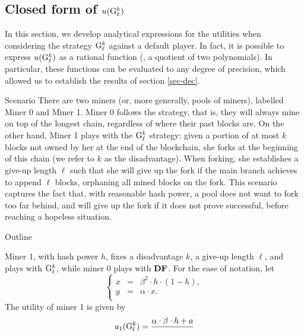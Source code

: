 

\subsection{Closed form of $u({\rm {G}}^k_\ell)$}

In this section, we develop analytical expressions for the utilities when considering the strategy ${\rm {G}}^k_\ell$ against a default player. In fact, it is possible to express $u({\rm {G}}^k_\ell)$ as a rational function (\ie, a quotient of two polynomials). In particular, these functions can be evaluated to any degree of precision, which allowed us to establish the results of section \ref{sec-dec}.

\begin{subsubsection}{Scenario}
There are two miners (or, more generally, pools of miners), labelled Miner 0 and Miner 1. Miner 0 follows the \cdf strategy, that is, they will always mine on top of the longest chain, regardless of where their past blocks are. On the other hand, Miner 1 plays with the ${\rm {G}}^k_\ell$ strategy: given a portion of at most $k$ blocks not owned by her at the end of the blockchain, she forks at the beginning of this chain (we refer to $k$ as the disadvantage). When forking, she establishes a give-up length $\ell$ such that she will give up the fork if the main branch achieves to append $\ell$ blocks, orphaning all mined blocks on the fork. This scenario captures the fact that, with reasonable hash power, a pool does not want to fork too far behind, and will give up the fork if it does not prove successful, before reaching a hopeless situation.
\end{subsubsection}

\begin{subsubsection}{Outline}

\end{subsubsection}

\begin{mythm}
Miner 1, with hash power $h$, fixes a disadvantage $k$, a give-up length $\ell$, and plays with ${\rm {G}}^k_\ell$, while miner 0 plays with $\text{\rm {\bf DF}}$. For the ease of notation, let
$$
\left\{
\begin{array}{lll}
x   & = & \beta^2 \cdot h \cdot (1 - h),\\
y   & = & \alpha \cdot x.\\
\end{array}
\right.
$$
The utility of miner 1 is given by
$$
u_1({\rm {G}}^k_\ell) = \frac{\alpha \cdot \beta \cdot h + a}{}
$$



\end{mythm}


